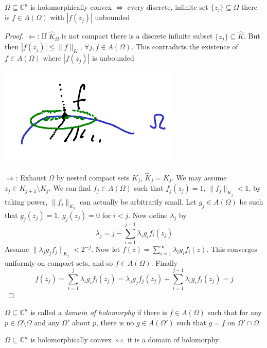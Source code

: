 \documentclass[../main.tex]{subfiles}
\begin{document}
\begin{proposition}
$\Omega\subseteq\mathbb C^n$ is holomorphically convex $\iff$ every discrete, infinite set $\{z_j\}\subseteq\Omega$ there is $f\in A(\Omega)$ with $|f(z_j)|$ unbounded
\end{proposition}

\begin{proof}
$\Leftarrow$: If $\hat K_\Omega$ is not compact there is a discrete infinite subset $\{z_j\}\subseteq\hat K$. But then $|f(z_j)|\leq\|f\|_K$, $\forall j,f\in A(\Omega)$. This contradicts the existence of $f\in A(\Omega)$ where $|f(z_j)|$ is unbounded
\begin{center}
\includegraphics[scale=1]{Pictures/Holomorphic_convexity.png}
\end{center}
$\Rightarrow$: Exhaust $\Omega$ by nested compact sets $K_j$, $\hat K_j=K_j$. We may assume $z_j\in K_{j+1}\setminus K_j$. We can find $f_j\in A(\Omega)$ such that $f_j(z_j)=1$, $\|f_j\|_{K_j}<1$, by taking power, $\|f_j\|_{K_j}$ can actually be arbitrarily small. Let $g_j\in A(\Omega)$ be such that $g_j(z_j)=1$, $g_j(z_j)=0$ for $i<j$. Now define $\lambda_j$ by
\[\lambda_j=j-\sum_{i=1}^{j-1}\lambda_ig_if_i(z_j)\]
Assume $\|\lambda_jg_jf_j\|_{K_j}<2^{-j}$. Now let $f(z)=\sum_{i=1}^\infty\lambda_ig_if_i(z)$. This converges uniformly on compact sets, and so $f\in A(\Omega)$. Finally
\[f(z_j)=\sum_{i=1}^j\lambda_ig_if_i(z_j)=\lambda_jg_jf_j(z_j)+\sum_{i=1}^{j-1}\lambda_ig_if_i(z_j)=j\]
\end{proof}

\begin{definition}
$\Omega\subseteq\mathbb C^n$ is called a \textit{domain of holomorphy} if there is $f\in A(\Omega)$ such that for any $p\in\overline\Omega\setminus\Omega$ and any $\Omega'$ about $p$, there is no $g\in A(\Omega')$ such that $g=f$ on $\Omega'\cap\Omega$
\end{definition}

\begin{theorem}
$\Omega\subseteq\mathbb C^n$ is holomorphically convex $\iff$ it is a domain of holomorphy
\end{theorem}
\end{document}
